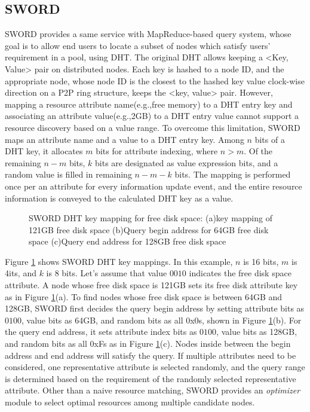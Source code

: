 \documentclass{acm_proc_article-sp}
\begin{document}
\subsection{SWORD}
SWORD provides a same service with MapReduce-based query system, whose goal is to allow end users to locate a subset of nodes which satisfy users' requirement in a pool, using DHT.
The original DHT allows keeping a <Key, Value> pair on distributed nodes. 
Each key is hashed to a node ID, and the appropriate node, whose node ID is the closest to the hashed key value clock-wise direction on a P2P ring structure\cite{chord}\cite{pastry}, keeps the <key, value> pair. 
However, mapping a resource attribute name(e.g.,free memory) to a DHT entry key and associating an attribute value(e.g.,2GB) to a DHT entry value cannot support a resource discovery based on a value range. 
To overcome this limitation, SWORD maps an attribute name and a value to a DHT entry key. Among $n$ bits of a DHT key, it allocates $m$ bits for attribute indexing, where $n>m$. 
Of the remaining $n-m$ bits, $k$ bits are designated as value expression bits, and a random value is filled in remaining $n-m-k$ bits.
The mapping is performed once per an attribute for every information update event, and the entire resource information is conveyed to the calculated DHT key as a value.
\begin{figure}
\centering
{}
\caption{\label{fig:sword}SWORD DHT key mapping for free disk space: (a)key mapping of 121GB free disk space (b)Query begin address for 64GB free disk space (c)Query end address for 128GB free disk space}
\end{figure}
Figure \ref{fig:sword} shows SWORD DHT key mappings. In this example, $n$ is 16 bits, $m$ is 4its, and $k$ is 8 bits. Let's assume that value $0010$ indicates the free disk space attribute.
A node whose free disk space is 121GB sets its free disk attribute key as in Figure \ref{fig:sword}(a).
To find nodes whose free disk space is between 64GB and 128GB, SWORD first decides the query begin address by setting attribute bits as $0100$, value bits as 64GB, and random bits as all 0x0s, shown in Figure \ref{fig:sword}(b).
For the query end address, it sets attribute index bits as $0100$, value bits as 128GB, and random bits as all 0xFs as in Figure \ref{fig:sword}(c).
Nodes inside between the begin address and end address will satisfy the query. 
If multiple attributes need to be considered, one representative attribute is selected randomly, and the query range is determined based on the requirement of the randomly selected representative attribute.
Other than a naive resource matching, SWORD provides an \textit{optimizer} module to select optimal resources among multiple candidate nodes. 
\end{document}
